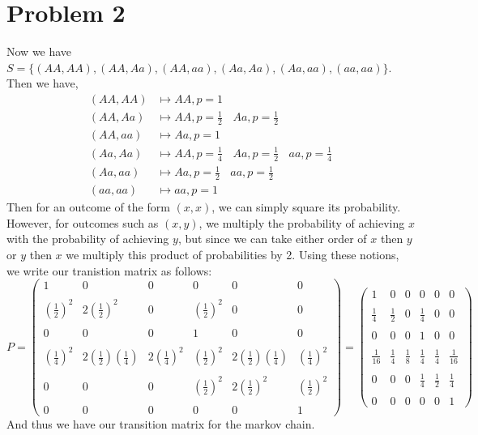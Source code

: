 \documentclass{article}
\theoremstyle{definition}
\begin{document}
\section*{Problem 2}
Now we have $S = \{(AA,AA), (AA,Aa), (AA,aa), (Aa,Aa), (Aa, aa), (aa,aa)\}$. Then we have,
\begin{align*}
    (AA,AA) &\mapsto AA, p = 1\\
    (AA,Aa) &\mapsto AA, p = \frac{1}{2} \ \ \ \ Aa, p = \frac{1}{2} \\
    (AA,aa) &\mapsto Aa, p = 1\\
    (Aa, Aa) &\mapsto AA, p = \frac{1}{4} \ \ \ \ Aa, p = \frac{1}{2} \ \ \ \ aa, p =\frac{1}{4}\\
    (Aa, aa) &\mapsto Aa, p = \frac{1}{2} \ \ \ \ aa, p = \frac{1}{2}\\
    (aa,aa) &\mapsto aa, p = 1
\end{align*}
Then for an outcome of the form $(x,x)$, we can simply square its probability. However,
for outcomes such as $(x,y)$, we multiply the probability of achieving $x$ with the probability of achieving $y$,
but since we can take either order of $x$ then $y$ or $y$ then $x$ we multiply this product of probabilities by 2.
Using these notions, we write our tranistion matrix as follows:
\[
    P = \begin{pmatrix}
        1 & 0 & 0 & 0 & 0 & 0\\\\
        (\frac{1}{2})^2 & 2(\frac{1}{2})^2 & 0 & (\frac{1}{2})^2 & 0 & 0\\\\
        0 & 0 & 0 & 1 & 0 & 0 \\\\
        (\frac{1}{4})^2 & 2(\frac{1}{2})(\frac{1}{4}) & 2(\frac{1}{4})^2 & (\frac{1}{2})^2 & 2(\frac{1}{2})(\frac{1}{4}) & (\frac{1}{4})^2 \\\\
        0 & 0 & 0 & (\frac{1}{2})^2 & 2(\frac{1}{2})^2 & (\frac{1}{2})^2 \\\\
        0 & 0 & 0 & 0 & 0 & 1
    \end{pmatrix}
    = \begin{pmatrix}
        1 & 0 & 0 & 0 & 0 & 0\\\\
        \frac{1}{4} & \frac{1}{2} & 0 & \frac{1}{4} & 0 & 0\\\\
        0 & 0 & 0 & 1 & 0 & 0 \\\\
        \frac{1}{16} & \frac{1}{4} & \frac{1}{8} & \frac{1}{4} & \frac{1}{4} & \frac{1}{16} \\\\
        0 & 0 & 0 & \frac{1}{4} & \frac{1}{2} & \frac{1}{4} \\\\
        0 & 0 & 0 & 0 & 0 & 1
    \end{pmatrix}
\]
And thus we have our transition matrix for the markov chain.
\end{document}

